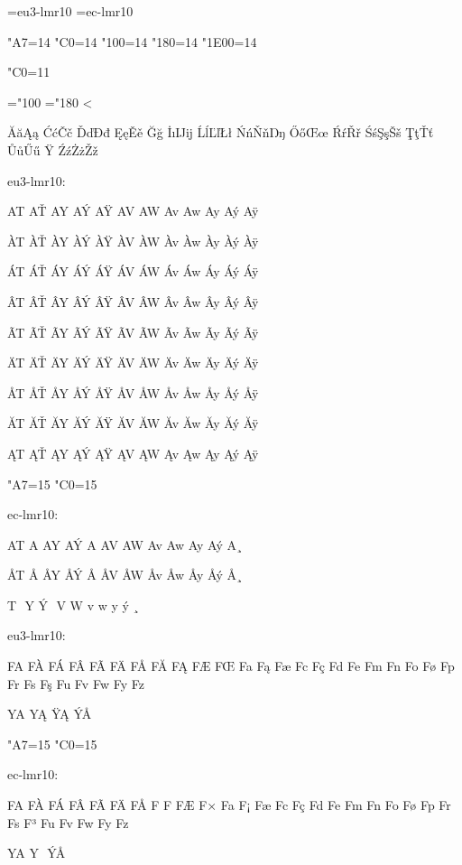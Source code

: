 
%
\parindent=0pt

\font\eulmr=eu3-lmr10
\font\eclmr=ec-lmr10
\eulmr

\kcatcode"A7=14
\kcatcode"C0=14
\kcatcode"100=14
\kcatcode"180=14
\kcatcode"1E00=14

\catcode"C0=11

\newcount\ChrA\newcount\ChrB
\def\SetCatCode#1{%
 \loop\ifnum\ChrA<\ChrB
  \catcode\ChrA=#1
  \sfcode{}
  \advance{}\relax \repeat
}

\ChrA="100 \ChrB="180
\SetCatCode{11}

ĂăĄą ĆćČč ĎďĐđ ĘęĚě Ğğ İıĲĳ ĹĺĽľŁł ŃńŇňŊŋ
ŐőŒœ ŔŕŘř ŚśŞşŠš ŢţŤť ŮůŰű Ÿ ŹźŻżŽž

eu3-lmr10:

AT AŤ AY AÝ AŸ AV AW Av Aw Ay Aý Aÿ

ÀT ÀŤ ÀY ÀÝ ÀŸ ÀV ÀW Àv Àw Ày Àý Àÿ

ÁT ÁŤ ÁY ÁÝ ÁŸ ÁV ÁW Áv Áw Áy Áý Áÿ

ÂT ÂŤ ÂY ÂÝ ÂŸ ÂV ÂW Âv Âw Ây Âý Âÿ

ÃT ÃŤ ÃY ÃÝ ÃŸ ÃV ÃW Ãv Ãw Ãy Ãý Ãÿ

ÄT ÄŤ ÄY ÄÝ ÄŸ ÄV ÄW Äv Äw Äy Äý Äÿ

ÅT ÅŤ ÅY ÅÝ ÅŸ ÅV ÅW Åv Åw Åy Åý Åÿ

ĂT ĂŤ ĂY ĂÝ ĂŸ ĂV ĂW Ăv Ăw Ăy Ăý Ăÿ

ĄT ĄŤ ĄY ĄÝ ĄŸ ĄV ĄW Ąv Ąw Ąy Ąý Ąÿ

{
\eclmr
\kcatcode"A7=15
\kcatcode"C0=15

ec-lmr10:

AT A^^94 AY A^^dd A^^98 AV AW Av Aw Ay A^^fd A^^b8

^^c5T ^^c5^^94 ^^c5Y ^^c5^^dd ^^c5^^98 ^^c5V ^^c5W ^^c5v ^^c5w ^^c5y ^^c5^^fd ^^c5^^b8

^^81T ^^81^^94 ^^81Y ^^81^^dd ^^81^^98 ^^81V ^^81W ^^81v ^^81w ^^81y ^^81^^fd ^^81^^b8
}

eu3-lmr10:

FA FÀ FÁ FÂ FÃ FÄ FÅ FĂ FĄ FÆ FŒ Fa Fą Fæ Fc Fç Fd Fe Fm Fn Fo Fø Fp Fr Fs Fş Fu Fv Fw Fy Fz

\hbox{YA}
\hbox{YĄ}
\hbox{ŸĄ}
\hbox{ÝÅ}

{
\eclmr
\kcatcode"A7=15
\kcatcode"C0=15

ec-lmr10:

FA F^^c0 F^^c1 F^^c2 F^^c3 F^^c4 F^^c5 F^^80 F^^81 F^^c6 F^^d7 Fa F^^a1 F^^e6 Fc F^^e7 Fd Fe Fm Fn Fo F^^f8 Fp Fr Fs F^^b3 Fu Fv Fw Fy Fz

\hbox{YA}
\hbox{Y^^81}
\hbox{^^98^^81}
\hbox{^^dd^^c5}
}


